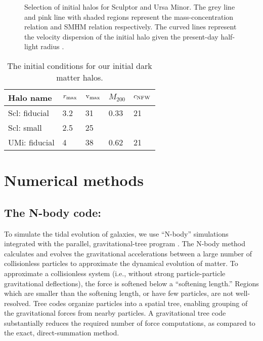 \begin{figure}
\centering
{}
\caption[Sculptor initial halos]{Selection of initial halos for Sculptor
and Ursa Minor. The grey line and pink line with shaded regions
represent the \citet{ludlow+2016} mass-concentration relation and
\citet{fattahi+2018} SMHM relation respectively. The curved lines
represent the velocity dispersion of the initial halo given the
present-day half-light radius \citep[via the][ mass
estimator]{wolf+2010}.}\label{fig:scl_halos}
\end{figure}

\begin{table*}[t]
\centering
\caption[Initial halos]{The initial conditions for our initial dark matter halos. }
\label{tbl:initial_halos}
\begin{tabular}{lllll}
\toprule
Halo name & $r_{\rm max}$ & ${\rm v}_{\rm max}$ & $M_{200}$ & $c_{\rm NFW}$\\
\midrule
Scl: fiducial & 3.2 & 31 & 0.33 & 21\\
Scl: small & 2.5 & 25 &  & \\
UMi: fiducial & 4 & 38 & 0.62 & 21\\
\bottomrule
\end{tabular}
\end{table*}

\section{Numerical methods}\label{numerical-methods}

\subsection{\texorpdfstring{The N-body code:
\gadget{}}{The N-body code: }}\label{the-n-body-code}

To simulate the tidal evolution of galaxies, we use ``N-body''
simulations integrated with the parallel, gravitational-tree program
\gadget{} \citep{gadget4}. The N-body method calculates and evolves the
gravitational accelerations between a large number of collisionless
particles to approximate the dynamical evolution of matter. To
approximate a collisionless system (i.e., without strong
particle-particle gravitational deflections), the force is softened
below a ``softening length.'' Regions which are smaller than the
softening length, or have few particles, are not well-resolved. Tree
codes organize particles into a spatial tree, enabling grouping of the
gravitational forces from nearby particles. A gravitational tree code
substantially reduces the required number of force computations, as
compared to the exact, direct-summation method.

